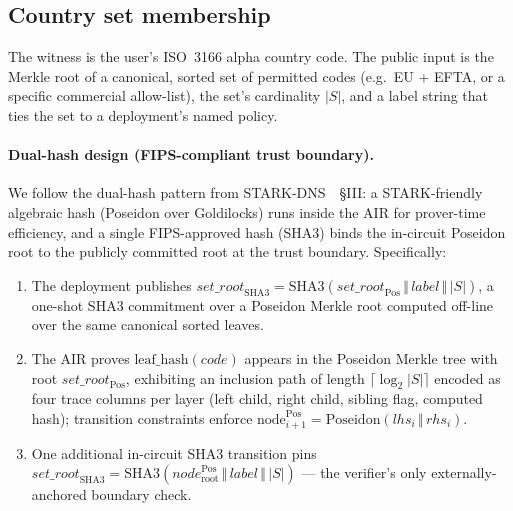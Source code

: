 \documentclass[11pt,a4paper]{article}
\begin{document}
\subsection{Country set membership}
\label{sec:air-country}

The witness is the user's ISO~3166 alpha
country code.  The public input is the Merkle root of a canonical,
sorted set of permitted codes (e.g.\ EU + EFTA, or a
specific commercial allow\nobreakdash-list), the set's cardinality
$|S|$, and a label string that ties the set to a deployment's named
policy.

\paragraph{Dual\nobreakdash-hash design (FIPS\nobreakdash-compliant
trust boundary).}  We follow the dual\nobreakdash-hash pattern from
STARK\nobreakdash-DNS~\cite{stark-dns}~\S{}III: a
STARK\nobreakdash-friendly algebraic hash (Poseidon over Goldilocks)
runs inside the AIR for prover\nobreakdash-time efficiency, and a
single FIPS\nobreakdash-approved hash (SHA3)
binds the in\nobreakdash-circuit Poseidon root to the publicly
committed root at the trust boundary.  Specifically:

\begin{enumerate}
  \item The deployment publishes
        $\mathit{set\_root}_{\mathrm{SHA3}} =
         \mathrm{SHA3}(\mathit{set\_root}_{\mathrm{Pos}}
         \,\Vert\, \mathit{label} \,\Vert\, |S|)$,
        a one\nobreakdash-shot SHA3 commitment over a Poseidon
        Merkle root computed off\nobreakdash-line over the same
        canonical sorted leaves.
  \item The AIR proves $\mathrm{leaf\_hash}(\mathit{code})$ appears
        in the Poseidon Merkle tree with root
        $\mathit{set\_root}_{\mathrm{Pos}}$, exhibiting an
        inclusion path of length $\lceil\log_2 |S|\rceil$ encoded
        as four trace columns per layer (left child, right child,
        sibling flag, computed hash); transition constraints
        enforce $\mathrm{node}_{i+1}^{\mathrm{Pos}} =
        \mathrm{Poseidon}(\mathit{lhs}_i \,\Vert\, \mathit{rhs}_i)$.
  \item One additional in\nobreakdash-circuit SHA3 transition pins
        $\mathit{set\_root}_{\mathrm{SHA3}} =
        \mathrm{SHA3}(\mathit{node}_{\mathrm{root}}^{\mathrm{Pos}}
        \,\Vert\, \mathit{label} \,\Vert\, |S|)$ — the verifier's
        only externally\nobreakdash-anchored boundary check.
\end{enumerate}
\end{document}
